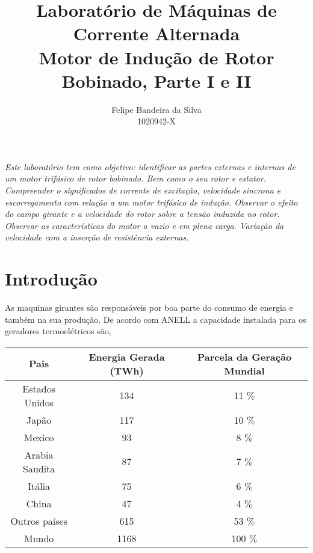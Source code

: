 \documentclass[paper=a4, fontsize=11pt]{article}
\title{Laboratório de Máquinas de Corrente Alternada\\
Motor de Indução de Rotor Bobinado, Parte I e II}
\author{Felipe Bandeira da Silva\\1020942-X}
\begin{document}
\maketitle


\textit{Este laboratório tem como objetivo: identificar 
as partes externas e internas de um motor trifásico de 
rotor bobinado. Bem como o seu rotor e estator. 
Compreender o significados de corrente de excitação, 
velocidade sincrona e escorregamento com relação a um 
motor trifásico de indução. Observar o efeito do 
campo girante e a velocidade do rotor sobre  a tensão
induzida no rotor. Observar as características do motor
a vazio e em plena carga. Variação da velocidade com a 
inserção de resistência externas.}

\newpage

\tableofcontents

\newpage



\newpage
\section{Introdução}
As maquinas girantes são responsáveis por boa parte
do consumo de energia e também na sua produção. De 
acordo com ANELL a capacidade instalada para os 
geradores termoelétricos são, 

\begin{center}
    \begin{tabular}{c|c|c}
        Pais & Energia Gerada (TWh) & Parcela da Geração Mundial \\
        \hline
        Estados Unidos & 134 & 11 $\%$ \\
        Japão & 117 & 10 $\%$ \\
        Mexico & 93 & 8 $\%$ \\
        Arabia Saudita & 87 & 7 $\%$ \\
        Itália & 75 & 6 $\%$ \\
        China & 47 & 4 $\%$ \\
        Outros países & 615 & 53 $\%$ \\
        Mundo & 1168 & 100 $\%$
    \end{tabular}
\end{center}
\end{document}
